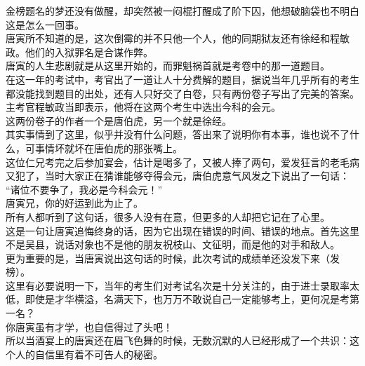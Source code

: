\begin{multicols}{\theparacolNo}
金榜题名的梦还没有做醒，却突然被一闷棍打醒成了阶下囚，他想破脑袋也不明白这是怎么一回事。\\

唐寅所不知道的是，这次倒霉的并不只他一个人，他的同期狱友还有徐经和程敏政。他们的入狱罪名是合谋作弊。\\

唐寅的人生悲剧就是从这里开始的，而罪魁祸首就是考卷中的那一道题目。\\

在这一年的考试中，考官出了一道让人十分费解的题目，据说当年几乎所有的考生都没能找到题目的出处，还有人只好交了白卷，只有两份卷子写出了完美的答案。\\

主考官程敏政当即表示，他将在这两个考生中选出今科的会元。\\

这两份卷子的作者一个是唐伯虎，另一个就是徐经。\\

其实事情到了这里，似乎并没有什么问题，答出来了说明你有本事，谁也说不了什么，可事情坏就坏在唐伯虎的那张嘴上。\\

这位仁兄考完之后参加宴会，估计是喝多了，又被人捧了两句，爱发狂言的老毛病又犯了，当时大家正在猜谁能够夺得会元，唐伯虎意气风发之下说出了一句话：\\

“诸位不要争了，我必是今科会元！”\\

唐寅兄，你的好运到此为止了。\\

所有人都听到了这句话，很多人没有在意，但更多的人却把它记在了心里。\\

这是一句让唐寅追悔终身的话，因为它出现在错误的时间、错误的地点。首先这里不是吴县，说话对象也不是他的朋友祝枝山、文征明，而是他的对手和敌人。\\

更为重要的是，当唐寅说出这句话的时候，此次考试的成绩单还没发下来（发榜）。\\

这里有必要说明一下，当年的考生们对考试名次是十分关注的，由于进士录取率太低，即使是才华横溢，名满天下，也万万不敢说自己一定能够考上，更何况是考第一名？\\

你唐寅虽有才学，也自信得过了头吧！\\

所以当酒宴上的唐寅还在眉飞色舞的时候，无数沉默的人已经形成了一个共识：这个人的自信里有着不可告人的秘密。\\


\end{multicols}
